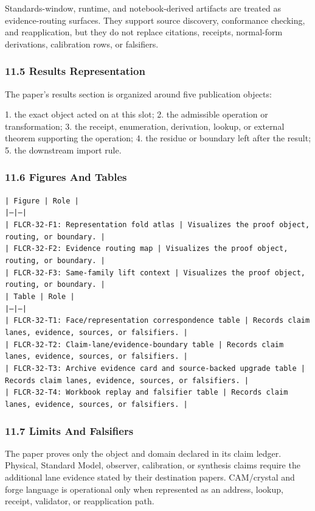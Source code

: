 \documentclass[11pt]{article}
\begin{document}
Standards-window, runtime, and notebook-derived artifacts are treated
as evidence-routing surfaces. They support source discovery, conformance
checking, and reapplication, but they do not replace citations, receipts,
normal-form derivations, calibration rows, or falsifiers.

\subsubsection*{11.5 Results Representation}

The paper's results section is organized around five publication objects:

1. the exact object acted on at this slot;
2. the admissible operation or transformation;
3. the receipt, enumeration, derivation, lookup, or external theorem supporting
   the operation;
4. the residue or boundary left after the result;
5. the downstream import rule.

\subsubsection*{11.6 Figures And Tables}

\noindent\texttt{| Figure | Role |}\\
\noindent\texttt{|---|---|}\\
\noindent\texttt{| FLCR-32-F1: Representation fold atlas | Visualizes the proof object, routing, or boundary. |}\\
\noindent\texttt{| FLCR-32-F2: Evidence routing map | Visualizes the proof object, routing, or boundary. |}\\
\noindent\texttt{| FLCR-32-F3: Same-family lift context | Visualizes the proof object, routing, or boundary. |}\\

\noindent\texttt{| Table | Role |}\\
\noindent\texttt{|---|---|}\\
\noindent\texttt{| FLCR-32-T1: Face/representation correspondence table | Records claim lanes, evidence, sources, or falsifiers. |}\\
\noindent\texttt{| FLCR-32-T2: Claim-lane/evidence-boundary table | Records claim lanes, evidence, sources, or falsifiers. |}\\
\noindent\texttt{| FLCR-32-T3: Archive evidence card and source-backed upgrade table | Records claim lanes, evidence, sources, or falsifiers. |}\\
\noindent\texttt{| FLCR-32-T4: Workbook replay and falsifier table | Records claim lanes, evidence, sources, or falsifiers. |}\\

\subsubsection*{11.7 Limits And Falsifiers}

The paper proves only the object and domain declared in its claim ledger.
Physical, Standard Model, observer, calibration, or synthesis claims require
the additional lane evidence stated by their destination papers. CAM/crystal
and forge language is operational only when represented as an address, lookup,
receipt, validator, or reapplication path.
\end{document}
